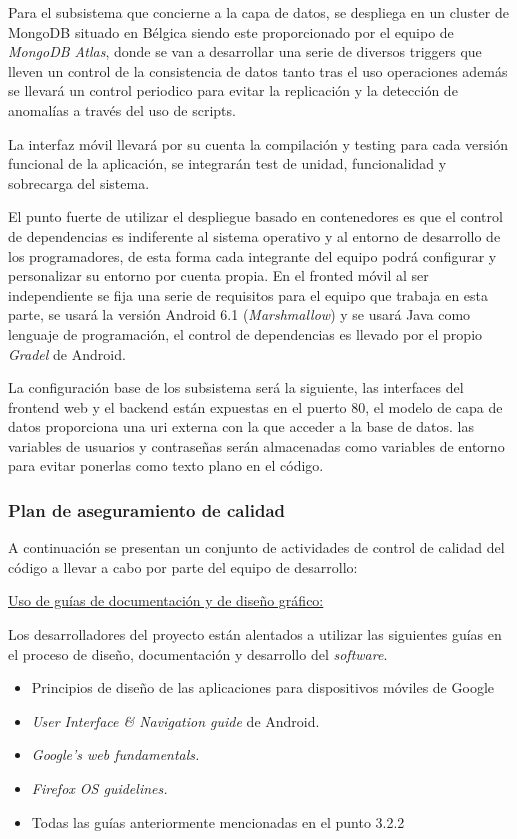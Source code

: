 \documentclass{article}
\begin{document}
Para el subsistema que concierne a la capa de datos, se despliega en un cluster de MongoDB situado en 
Bélgica siendo este proporcionado por el equipo de \textit{MongoDB Atlas}, donde se van a desarrollar una 
serie de diversos triggers que lleven un control de la consistencia de datos tanto tras el uso operaciones 
además se llevará un control periodico para evitar la replicación y la detección de anomalías a través del uso de scripts.

La interfaz móvil llevará por su cuenta la compilación y testing para cada versión funcional de la aplicación, 
se integrarán test de unidad, funcionalidad y sobrecarga del sistema.

El punto fuerte de utilizar el despliegue basado en contenedores es que el control de dependencias es 
indiferente al sistema operativo y al entorno de desarrollo de los programadores, de esta forma cada integrante del 
equipo podrá configurar y personalizar su entorno por cuenta propia. 
En el fronted móvil al ser independiente se fija una serie de requisitos para el equipo que trabaja en esta parte, 
se usará la versión Android 6.1 (\textit{Marshmallow}) y se usará Java como lenguaje de programación, el control de 
dependencias es llevado por el propio \textit{Gradel} de Android.

La configuración base de los subsistema será la siguiente, las interfaces del frontend web y el backend están 
expuestas en el puerto 80, el modelo de capa de datos proporciona una uri externa con la que acceder a la base de 
datos. las variables de usuarios y contraseñas serán almacenadas como variables de entorno para evitar ponerlas como 
texto plano en el código.

\subsubsection{Plan de aseguramiento de calidad}

A continuación se presentan un conjunto de actividades de control de calidad del código a llevar a cabo por parte 
del equipo de desarrollo:

\underline{Uso de guías de documentación y de diseño gráfico:}

Los desarrolladores del proyecto están alentados a utilizar las siguientes guías en el proceso de diseño, 
documentación y desarrollo del \textit{software}.

\begin{itemize}
    \setlength{\itemsep}{0em} %
    \item Principios de diseño de las aplicaciones para dispositivos móviles de Google
    \item \textit{User Interface \& Navigation guide} de Android.
    \item \textit{Google's web fundamentals.}
    \item \textit{Firefox OS guidelines.}
    \item Todas las guías anteriormente mencionadas en el punto 3.2.2
\end{itemize}
\end{document}
